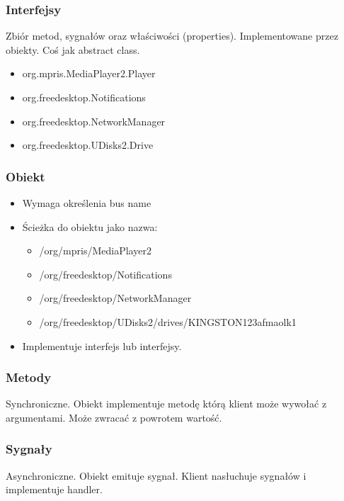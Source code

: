 \begin{frame}
    \frametitle{Interfejsy}
    Zbiór metod, sygnałów oraz właściwości (properties).
    Implementowane przez obiekty. 
    Coś jak abstract class.
    \begin{itemize}
        \item org.mpris.MediaPlayer2.Player
        \item org.freedesktop.Notifications
        \item org.freedesktop.NetworkManager
        \item org.freedesktop.UDisks2.Drive
    \end{itemize}
\end{frame}

\begin{frame}
    \frametitle{Obiekt}
    \begin{itemize}
        \item Wymaga określenia bus name 
        \item Ścieżka do obiektu jako nazwa:
        \begin{itemize}
            \item /org/mpris/MediaPlayer2 
            \item /org/freedesktop/Notifications
            \item /org/freedesktop/NetworkManager
            \item /org/freedesktop/UDisks2/drives/KINGSTON123afmaolk1
        \end{itemize}
        \item Implementuje interfejs lub interfejsy.
    \end{itemize}
\end{frame}



\begin{frame}
    \frametitle{Metody}
    Synchroniczne. Obiekt implementuje metodę którą
    klient może wywołać z argumentami. Może zwracać
    z powrotem wartość.
\end{frame}

\begin{frame}
    \frametitle{Sygnały}
    Asynchroniczne. Obiekt emituje sygnał.
    Klient nasłuchuje sygnałów i implementuje handler.
\end{frame}


